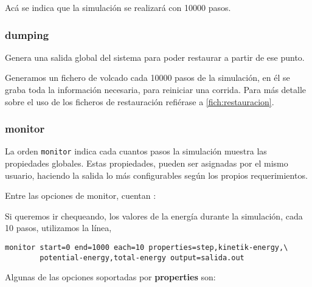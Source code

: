 
Ac\'a se indica que la simulaci\'on se realizar\'a con 10000 pasos.

\subsubsection{dumping}
Genera una salida global del sistema para poder restaurar a partir de ese punto.


Generamos un fichero de volcado cada 10000 pasos de la simulaci\'on, en \'el se graba toda la informaci\'on necesaria, para reiniciar una corrida. Para m\'as detalle sobre el uso de los ficheros de restauraci\'on refi\'erase a \ref{fich:restauracion}.

\subsubsection{monitor}
La orden \verb|monitor| indica cada cuantos pasos la simulaci\'on muestra las propiedades globales. Estas propiedades, pueden ser asignadas por el mismo usuario, haciendo la salida lo m\'as configurables seg\'un los propios requerimientos.

Entre las opciones de monitor, cuentan :


Si queremos ir chequeando, los valores de la energ\'ia durante la simulaci\'on, cada 10 pasos, utilizamos la l\'inea,

\begin{verbatim}
monitor start=0 end=1000 each=10 properties=step,kinetik-energy,\
        potential-energy,total-energy output=salida.out
\end{verbatim}

Algunas de las opciones soportadas por \textbf{properties} son:

